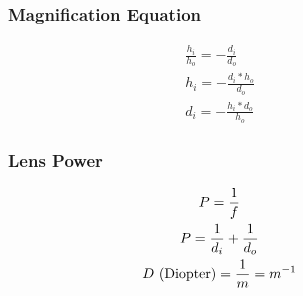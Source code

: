 \documentclass{article}
\begin{document}
\begin{figure}[ht]
    \begin{minipage}[t]{0.4\linewidth}
        \subsubsection{Magnification Equation}
        \begin{gather}
            \frac{h_i}{h_o} = -\frac{d_i}{d_o} \\
            h_i = -\frac{d_i*h_o}{d_o} \\
            d_i = -\frac{h_i*d_o}{h_o}
        \end{gather}
    \end{minipage}
    \hfill\vline\hfill
    \begin{minipage}[t]{0.4\linewidth}
        \subsubsection{Lens Power}
        \begin{gather}
            P = \frac{1}{f} \\
            P = \frac{1}{d_i} + \frac{1}{d_o} \\
            D \textnormal{ (Diopter)} = \frac{1}{m} = m^{-1}
        \end{gather}
    \end{minipage}
\end{figure}

\newpage
\end{document}
